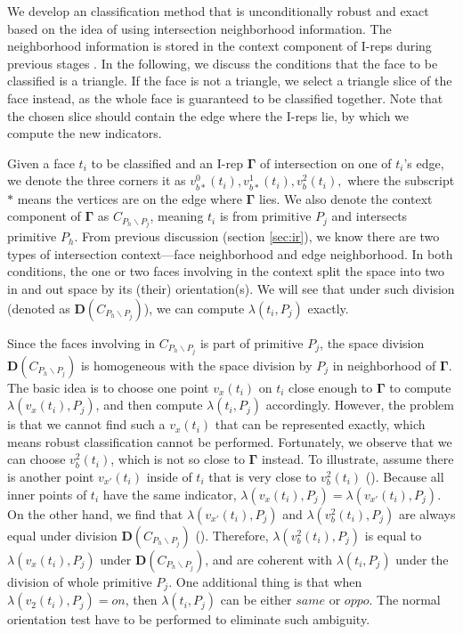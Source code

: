 \documentclass[10pt,journal,compsoc]{IEEEtran}
\begin{document}
We develop an classification method that is unconditionally robust and exact based on the idea of using intersection neighborhood information. The neighborhood information is stored in the context component of I-reps during previous stages . In the following, we discuss the conditions that the face to be classified is a triangle. If the face is not a triangle, we select a triangle slice of the face instead, as the whole face is guaranteed to be classified together. Note that the chosen slice should contain the edge where the I-reps lie, by which we compute the new indicators.

Given a face $t_i$ to be classified and an I-rep $\boldsymbol\Gamma$ of intersection on one of $t_i$'s edge, we denote the three corners it as $v_{b*}^{0}(t_i), v_{b*}^{1}(t_i), v_b^2(t_i),$ where the subscript $*$ means the vertices are on the edge where $\boldsymbol\Gamma$ lies. We also denote the context component of $\boldsymbol\Gamma$ as $C_{P_h \backslash P_j}$, meaning $t_i$ is from primitive $P_j$ and intersects primitive $P_h$. From previous discussion (section \ref{sec:ir}){\color{red}{may be more than one}}, we know there are two types of intersection context---face neighborhood and edge neighborhood. In both conditions, the one or two faces involving in the context split the space into two in and out space by its (their) orientation(s). We will see that under such division (denoted as $\boldsymbol{D}(C_{P_h \backslash P_j})$), we can compute $\lambda(t_i, P_j)$ exactly.

Since the faces involving in $C_{P_h \backslash P_j}$ is part of primitive $P_j$, the space division $\boldsymbol{D}(C_{P_h \backslash P_j})$ is homogeneous with the space division by $P_j$ in neighborhood of $\boldsymbol{\Gamma}$. The basic idea is to choose one point $v_x(t_i)$ on $t_i$ close enough to $\boldsymbol{\Gamma}$ to compute $\lambda(v_x(t_i), P_j)$, and then compute $\lambda(t_i, P_j)$ accordingly. However, the problem is that we cannot find such a $v_x(t_i)$ that can be represented exactly, which means robust classification cannot be performed. Fortunately, we observe that we can choose $v_b^2(t_i)$, which is not so close to $\boldsymbol{\Gamma}$ instead. To illustrate, assume there is another point $v_{x'}(t_i)$ inside of $t_i$ that is very close to $v_b^2(t_i)$ ({\color{red}{Fig. x}}). Because all inner points of $t_i$ have the same indicator, $\lambda(v_x(t_i), P_j) = \lambda(v_{x'}(t_i), P_j)$. On the other hand, we find that $\lambda(v_{x'}(t_i), P_j)$ and $\lambda(v_b^2(t_i), P_j)$ are always equal under division $\boldsymbol{D}(C_{P_h \backslash P_j})$ ({}). Therefore, $\lambda(v_b^2(t_i), P_j)$ is equal to $\lambda(v_x(t_i), P_j)$ under $\boldsymbol{D}(C_{P_h \backslash P_j})$, and are coherent with $\lambda(t_i, P_j)$ under the division of whole primitive $P_j$. One additional thing is that when $\lambda(v_2(t_i), P_j)=on$, then $\lambda(t_i, P_j)$ can be either $same$ or $oppo$. The normal orientation test have to be performed to eliminate such ambiguity.
\end{document}
